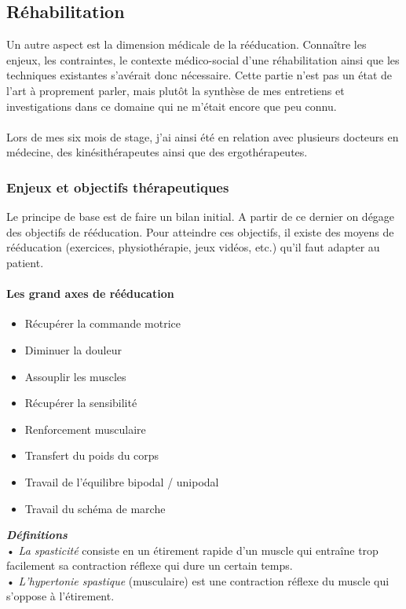 	\subsection{Réhabilitation}
Un autre aspect est la dimension médicale de la rééducation. Connaître les enjeux, les contraintes, le contexte médico-social d'une réhabilitation ainsi que les techniques existantes s'avérait donc nécessaire. Cette partie n'est pas un état de l'art à proprement parler, mais plutôt la synthèse de mes entretiens et investigations dans ce domaine qui ne m'était encore que peu connu.
\paragraph{}
Lors de mes six mois de stage, j'ai ainsi été en relation avec plusieurs docteurs en médecine, des kinésithérapeutes ainsi que des ergothérapeutes.

	\subsubsection{Enjeux et objectifs thérapeutiques}
Le principe de base est de faire un bilan initial.  A partir de ce dernier on dégage des objectifs  de rééducation. Pour atteindre ces objectifs, il existe des moyens de rééducation (exercices, physiothérapie, jeux vidéos, etc.) qu'il faut adapter au patient.

\paragraph{Les grand axes de rééducation}
\begin{itemize} 
	\item	Récupérer la commande motrice 
	\item Diminuer la douleur
	\item Assouplir les muscles 
	\item Récupérer la sensibilité 
	\item Renforcement musculaire 
	\item Transfert du poids du corps 
	\item Travail de l'équilibre bipodal / unipodal 
	\item Travail du schéma de marche
\end{itemize}

	\textbf{\emph{Définitions}\\}
• \emph{La spasticité} consiste en un étirement rapide d'un muscle qui entraîne trop facilement sa contraction réflexe qui dure un certain temps. \\
• \emph{L’hypertonie spastique} (musculaire) est une contraction réflexe du muscle qui s'oppose à l'étirement.\\

